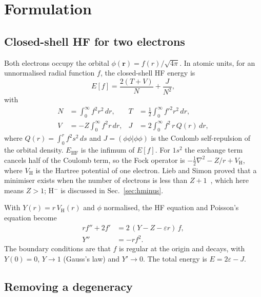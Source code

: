 \documentclass[aps,pra,reprint,superscriptaddress,amsmath,amssymb,longbibliography]{revtex4-2}
\newcommand{\EHF}{E_\mathrm{HF}}
\begin{document}
\section{Formulation}\label{sec:formulation}

\subsection{Closed-shell HF for two electrons}

Both electrons occupy the orbital $\phi(\bm r)=f(r)/\sqrt{4\pi}$. In atomic units, for an unnormalised radial function $f$, the closed-shell HF energy is
\begin{equation}
E[f]=\frac{2(T+V)}{N}+\frac{J}{N^2}, \label{eq:functional}
\end{equation}
with
\begin{align}
N&=\int_0^\infty f^2r^2\,dr, & T&=\frac12\int_0^\infty f'^2r^2\,dr, \nonumber\\
V&=-Z\int_0^\infty f^2r\,dr, & J&=2\int_0^\infty f^2\,r\,Q(r)\,dr, \label{eq:integrals}
\end{align}
where $Q(r)=\int_0^r f^2s^2\,ds$ and $J=(\phi\phi|\phi\phi)$ is the Coulomb self-repulsion of the orbital density. $\EHF$ is the infimum of $E[f]$. For $1s^2$ the exchange term cancels half of the Coulomb term, so the Fock operator is $-\tfrac12\nabla^2-Z/r+V_\mathrm H$, where $V_\mathrm H$ is the Hartree potential of one electron. Lieb and Simon proved that a minimiser exists when the number of electrons is less than $Z+1$~\cite{LiebSimon1977}, which here means $Z>1$; H$^-$ is discussed in Sec.~\ref{sec:hminus}.

With $Y(r)=r\,V_\mathrm H(r)$ and $\phi$ normalised, the HF equation and Poisson's equation become
\begin{align}
r f''+2f'&=2\,(Y-Z-\varepsilon r)\,f, \label{eq:hf}\\
Y''&=-r f^2. \label{eq:poisson}
\end{align}
The boundary conditions are that $f$ is regular at the origin and decays, with $Y(0)=0$, $Y\to1$ (Gauss's law) and $Y'\to0$. The total energy is $E=2\varepsilon-J$.

\subsection{Removing a degeneracy}
\end{document}
